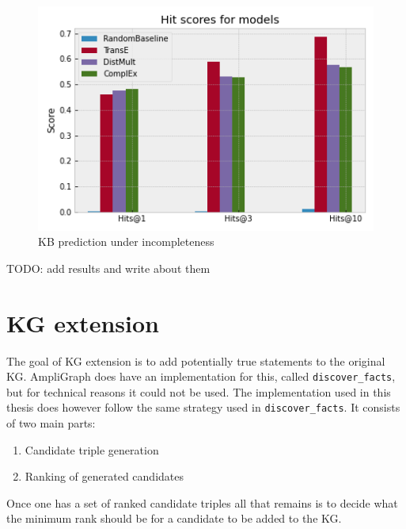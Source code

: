 \begin{figure}[htp]
    \centering
    \includegraphics[width=12cm]{figures/model_selection/family_hit_scores.png}
    \caption{KB prediction under incompleteness}
\end{figure}






TODO: add results and write about them

\newpage

\section{KG extension}

The goal of KG extension is to add potentially true statements to the original KG. AmpliGraph does have an implementation for this, called \texttt{discover\_facts}, but for technical reasons it could not be used. The implementation used in this thesis does however follow the same strategy used in \texttt{discover\_facts}. It consists of two main parts:
\begin{enumerate}
    \item Candidate triple generation
    \item Ranking of generated candidates
\end{enumerate}
Once one has a set of ranked candidate triples all that remains is to decide what the minimum rank should be for a candidate to be added to the KG.


